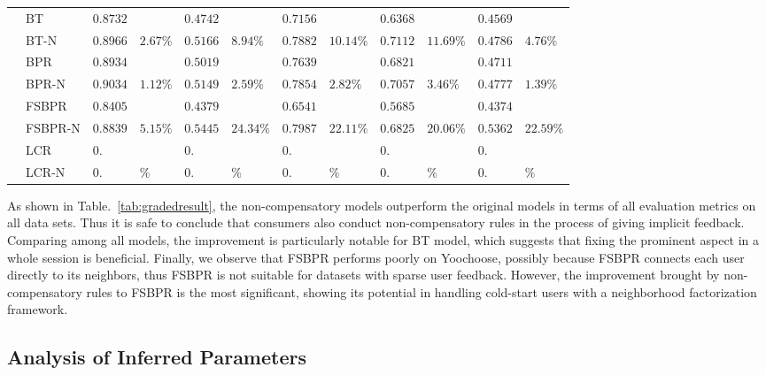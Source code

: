 \documentclass[letterpaper]{article} %
\begin{document}
\begin{table*}[ht]
\begin{center}
\begin{tabular}{p{0.4cm}<{\centering}|p{1.2cm}<{\centering} |p{0.5cm} p{0.6cm} |p{0.5cm} p{0.6cm} |p{0.5cm} p{0.6cm}|p{0.5cm} p{0.6cm} |p{0.5cm} p{0.6cm}}
	\hline
{}	&BT	& $0.8732 $&  &$0.4742$& &$0.7156$&   &$0.6368$& 	& $0.4569$ 	&\\
	&BT-N	&$0.8966$ &	$2.67\%$	&$0.5166 $	&$8.94\%$	&$0.7882$ &	$10.14\%$	&$0.7112$ &	$11.69\%$	&$0.4786 $	&$4.76\%$\\
	&BPR&	$0.8934$ 	&&	$0.5019$ 	&&	$0.7639$ & &$0.6821$& 	& $0.4711$ 	&\\
	&BPR-N	&$0.9034$ 	&$1.12\%$	&$0.5149$ &	$2.59\%$	&$0.7854$ 	&$2.82\%$ &$0.7057$ &	$3.46\%$	&$0.4777 $	&$1.39\%$	\\
	&FSBPR		&$0.8405$&	&$0.4379$ 	&&	$0.6541$& &$0.5685$& 	& $0.4374$ 	&\\	
	&FSBPR-N	&$0.8839$	&$5.15\%$	&	$0.5445$ 	&$24.34\%$	&$0.7987$ 	&$22.11\%$ &$0.6825$ &	$20.06\%$	&$0.5362 $	&$22.59\%$	\\
	&LCR		&$0.$&	&$0.$ 	&&	$0.$& &$0.$& 	& $0.$ 	&\\	
	&LCR-N	&$0.$	&$\%$	&	$0.$ 	&$\%$	&$0.$ 	&$\%$ &$0.$ &	$\%$	&$0. $	&$\%$\\
	\hline
	\end{tabular}
\end{center}
\label{tab:ratingresult}
\end{table*}%

As shown in Table.~\ref{tab:gradedresult}, the non-compensatory models outperform the original models in terms of all evaluation metrics on all data sets. Thus it is safe to conclude that consumers also conduct non-compensatory rules in the process of giving implicit feedback. Comparing among all models, the improvement is particularly notable for BT model, which suggests that fixing the prominent aspect in a whole session is beneficial. Finally, we observe that FSBPR performs poorly on Yoochoose, possibly because FSBPR connects each user directly to its neighbors, thus FSBPR is not suitable for datasets with sparse user feedback. However, the improvement brought by non-compensatory rules to FSBPR is the most significant, showing its potential in handling cold-start users with a neighborhood factorization framework. 

\subsection{Analysis of Inferred Parameters}
\end{document}
